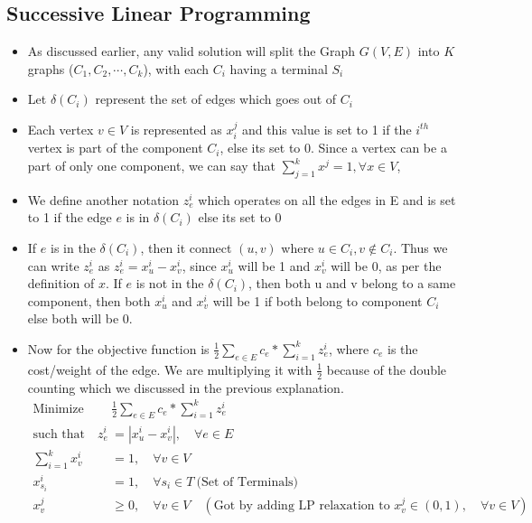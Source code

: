 \documentclass[11pt]{article}
\begin{document}
\subsection{Successive Linear Programming}
\begin{itemize} \itemsep -3pt
    \item As discussed earlier, any valid solution will split the Graph $G(V,E)$ into $K$ graphs ($C_1, C_2,\cdots,C_k$), with each $C_i$ having a terminal $S_i$
    \item Let $\delta(C_i)$ represent the set of edges which goes out of $C_i$
    \item Each vertex $v \in V$ is represented as $x_i^j$ and this value is set to 1 if the $i^{th}$ vertex is part of the component $C_i$, else its set to 0. Since a vertex can be a part of only one component, we can say that $\sum_{j=1}^{k}{x^j} = 1, \forall x \in V$, 
    \item We define another notation $z_e^i$ which operates on all the edges in E and is set to 1 if the edge $e$ is in $\delta(C_i)$ else its set to 0
    \item If $e$ is in the $\delta(C_i)$, then it connect $(u,v)$ where $u \in C_i, v \notin C_i$. Thus we can write $z_e^i$ as $z_e^i = x_u^i - x_v^i$, since $x_u^i$ will be 1 and $x_v^i$ will be 0, as per the definition of $x$. If $e$ is not in the $\delta(C_i)$, then both u and v belong to a same component, then both $x_u^i$ and $x_v^i$ will be 1 if both belong to component $C_i$ else both will be 0.
    \item Now for the objective function is $\frac{1}{2}\sum\limits_{e \in E}{c_e * \sum\limits_{i=1}^{k}{z_e^i}}$, where $c_e$ is the cost/weight of the edge. We are multiplying it with $\frac{1}{2}$ because of the double counting which we discussed in the previous explanation.
           \begin{align*}
            \text{Minimize} \quad & \frac{1}{2}\sum\limits_{e \in E}{c_e * \sum\limits_{i=1}^{k}{z_e^i}}\\
            \text{such that}  \quad z_e^i &= |x_u^i - x_v^i|, \quad \forall e \in E\\
            \sum\limits_{i=1}^{k}{x_v^i} &= 1,\quad \forall v \in V\\
            x_{s_i}^i &= 1,\quad \forall s_i \in T \ \text{(Set of Terminals)}\\
            x_v^j &\ge 0, \quad \forall v \in V\quad (\text{Got by adding LP relaxation to }x_v^j \in (0,1),\quad \forall v \in V)\\
        \end{align*}
\end{itemize}
\end{document}
